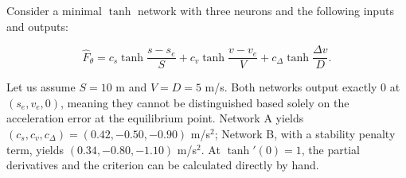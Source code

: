 \documentclass[11pt,a4paper,openany]{book}
\numberwithin{equation}{chapter}
\numberwithin{figure}{chapter}
\numberwithin{table}{chapter}
\begin{document}
Consider a minimal $\tanh$ network with three neurons and the following inputs and outputs:

\begin{equation}
\widehat F_\theta
=c_s\tanh\!\frac{s-s_e}{S}
+c_v\tanh\!\frac{v-v_e}{V}
+c_\Delta\tanh\!\frac{\Delta v}{D}.
\label{eq:ml-toy-network}
\end{equation}

Let us assume $S=10$ m and $V=D=5$ m/s. Both networks output exactly 0 at $(s_e,v_e,0)$, meaning they cannot be distinguished based solely on the acceleration error at the equilibrium point. Network A yields $(c_s,c_v,c_\Delta)=(0.42,-0.50,-0.90)$ m/s$^2$; Network B, with a stability penalty term, yields $(0.34,-0.80,-1.10)$ m/s$^2$. At $\tanh'(0)=1$, the partial derivatives and the criterion can be calculated directly by hand.
\end{document}
